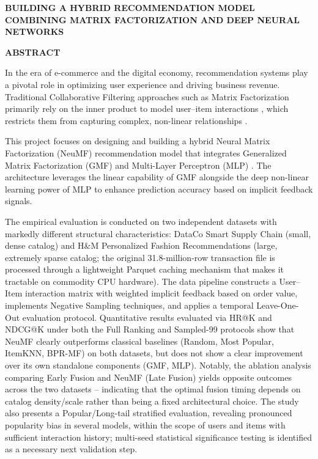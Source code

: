\newpage
\begin{center}
{\fontsize{15pt}{18pt}\selectfont \textbf{BUILDING A HYBRID RECOMMENDATION MODEL COMBINING MATRIX FACTORIZATION AND DEEP NEURAL NETWORKS}\par}
\vspace{0.5cm}
{\fontsize{16pt}{19.2pt}\selectfont \textbf{ABSTRACT}\par}
\end{center}
\vspace{0.2cm}

In the era of e-commerce and the digital economy, recommendation systems play a pivotal role in optimizing user experience and driving business revenue. Traditional Collaborative Filtering approaches such as Matrix Factorization primarily rely on the inner product to model user--item interactions \parencite{koren2009matrix}, which restricts them from capturing complex, non-linear relationships \parencite{he2017ncf}.

This project focuses on designing and building a hybrid Neural Matrix Factorization (NeuMF) recommendation model that integrates Generalized Matrix Factorization (GMF) and Multi-Layer Perceptron (MLP) \parencite{he2017ncf}. The architecture leverages the linear capability of GMF alongside the deep non-linear learning power of MLP to enhance prediction accuracy based on implicit feedback signals.

The empirical evaluation is conducted on two independent datasets with markedly different structural characteristics: DataCo Smart Supply Chain \parencite{dataco2019} (small, dense catalog) and H\&M Personalized Fashion Recommendations (large, extremely sparse catalog; the original 31.8-million-row transaction file is processed through a lightweight Parquet caching mechanism that makes it tractable on commodity CPU hardware). The data pipeline constructs a User--Item interaction matrix with weighted implicit feedback based on order value, implements Negative Sampling techniques, and applies a temporal Leave-One-Out evaluation protocol. Quantitative results evaluated via HR@K and NDCG@K \parencite{jarvelin2002} under both the Full Ranking and Sampled-99 protocols show that NeuMF clearly outperforms classical baselines (Random, Most Popular, ItemKNN, BPR-MF) on both datasets, but does not show a clear improvement over its own standalone components (GMF, MLP). Notably, the ablation analysis comparing Early Fusion and NeuMF (Late Fusion) yields opposite outcomes across the two datasets -- indicating that the optimal fusion timing depends on catalog density/scale rather than being a fixed architectural choice. The study also presents a Popular/Long-tail stratified evaluation, revealing pronounced popularity bias in several models, within the scope of users and items with sufficient interaction history; multi-seed statistical significance testing is identified as a necessary next validation step.